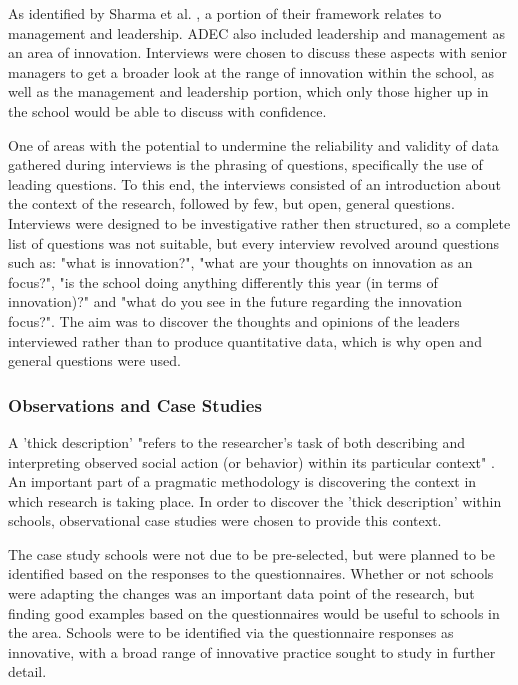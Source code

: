 As identified by Sharma et al. \citep{Sharma2005}, a portion of their framework relates to management and leadership. ADEC also included leadership and management as an area of innovation. Interviews were chosen to discuss these aspects with senior managers to get a broader look at the range of innovation within the school, as well as the management and leadership portion, which only those higher up in the school would be able to discuss with confidence.

One of areas with the potential to undermine the reliability and validity of data gathered during interviews is the phrasing of questions, specifically the use of leading questions. To this end, the interviews consisted of an introduction about the context of the research, followed by few, but open, general questions. Interviews were designed to be investigative rather then structured, so a complete list of questions was not suitable, but every interview revolved around questions such as: "what is innovation?", "what are your thoughts on innovation as an focus?", "is the school doing anything differently this year (in terms of innovation)?" and "what do you see in the future regarding the innovation focus?". The aim was to discover the thoughts and opinions of the leaders interviewed rather than to produce quantitative data, which is why open and general questions were used.

\subsubsection{Observations and Case Studies}

A 'thick description' "refers to the researcher’s task of both describing and interpreting observed social action (or behavior) within its particular context" \cite[p. 543]{thickdescription}. An important part of a pragmatic methodology is discovering the context in which research is taking place. In order to discover the 'thick description' within schools, observational case studies were chosen to provide this context.

The case study schools were not due to be pre-selected, but were planned to be identified based on the responses to the questionnaires. Whether or not schools were adapting the changes was an important data point of the research, but finding good examples based on the questionnaires would be useful to schools in the area. Schools were to be identified via the questionnaire responses as innovative, with a broad range of innovative practice sought to study in further detail.

